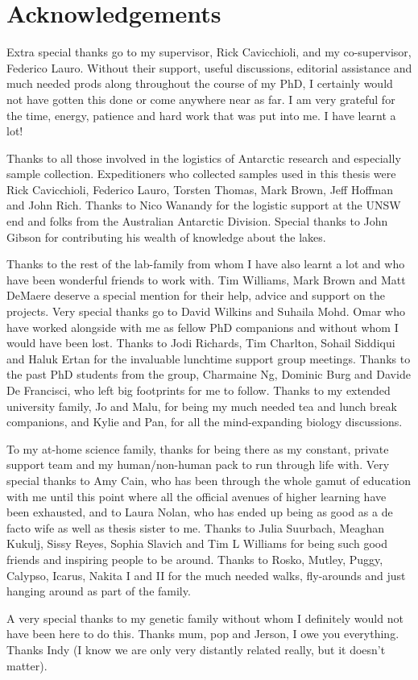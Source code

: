 \chapter*{Acknowledgements}
Extra special thanks go to my supervisor, Rick Cavicchioli, and my co-supervisor, Federico Lauro.
Without their support, useful discussions, editorial assistance and much needed prods along throughout the course of my PhD, I certainly would not have gotten this done or come anywhere near as far.
I am very grateful for the time, energy, patience and hard work that was put into me.
I have learnt a lot!

Thanks to all those involved in the logistics of Antarctic research and especially sample collection.
Expeditioners who collected samples used in this thesis were Rick Cavicchioli, Federico Lauro, Torsten Thomas, Mark Brown, Jeff Hoffman and John Rich.
Thanks to Nico Wanandy for the logistic support at the UNSW end and folks from the Australian Antarctic Division.
Special thanks to John Gibson for contributing his wealth of knowledge about the lakes.

Thanks to the rest of the lab-family from whom I have also learnt a lot and who have been wonderful friends to work with.
Tim Williams, Mark Brown and Matt DeMaere deserve a special mention for their help, advice and support on the projects.
Very special thanks go to David Wilkins and Suhaila Mohd. Omar who have worked alongside with me as fellow PhD companions and without whom I would have been lost.
Thanks to Jodi Richards, Tim Charlton, Sohail Siddiqui and Haluk Ertan for the invaluable lunchtime support group meetings.
Thanks to the past PhD students from the group, Charmaine Ng, Dominic Burg and Davide De Francisci, who left big footprints for me to follow.
Thanks to my extended university family, Jo and Malu, for being my much needed tea and lunch break companions, and Kylie and Pan, for all the mind-expanding biology discussions.

To my at-home science family, thanks for being there as my constant, private support team and my human/non-human pack to run through life with.
Very special thanks to Amy Cain, who has been through the whole gamut of education with me until this point where all the official avenues of higher learning have been exhausted, and to Laura Nolan, who has ended up being as good as a de facto wife as well as thesis sister to me.
Thanks to Julia Suurbach, Meaghan Kukulj, Sissy Reyes, Sophia Slavich and Tim L Williams for being such good friends and inspiring people to be around.
Thanks to Rosko, Mutley, Puggy, Calypso, Icarus, Nakita I and II for the much needed walks, fly-arounds and just hanging around as part of the family.

A very special thanks to my genetic family without whom I definitely would not have been here to do this.
Thanks mum, pop and Jerson, I owe you everything.
Thanks Indy (I know we are only very distantly related really, but it doesn't matter).

